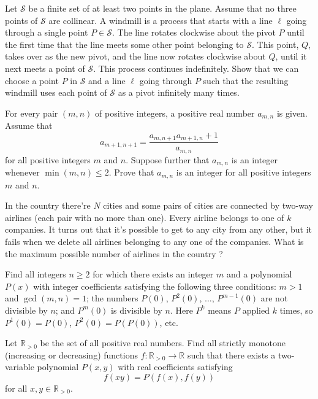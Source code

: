 \documentclass[11pt]{scrartcl}
\begin{document}
\begin{problem}[56332281758558]
	Let $\mathcal{S}$ be a finite set of at least two points in the plane. Assume that no three points of $\mathcal S$ are collinear. A windmill is a process that starts with a line $\ell$ going through a single point $P \in \mathcal S$. The line rotates clockwise about the pivot $P$ until the first time that the line meets some other point belonging to $\mathcal S$. This point, $Q$, takes over as the new pivot, and the line now rotates clockwise about $Q$, until it next meets a point of $\mathcal S$. This process continues indefinitely.
Show that we can choose a point $P$ in $\mathcal S$ and a line $\ell$ going through $P$ such that the resulting windmill uses each point of $\mathcal S$ as a pivot infinitely many times.
\end{problem}
\begin{problem}[5180896359975323937]
For every pair $(m, n)$ of positive integers, a positive real number $a_{m, n}$ is given. Assume that
\[a_{m+1, n+1} = \frac{a_{m, n+1} a_{m+1, n} + 1}{a_{m, n}}\]for all positive integers $m$ and $n$. Suppose further that $a_{m, n}$ is an integer whenever $\min(m, n) \le 2$. Prove that $a_{m, n}$ is an integer for all positive integers $m$ and $n$.
\end{problem}
\begin{problem}[697045850918084]
	In the country there're $N$ cities and some pairs of cities are connected by two-way airlines (each pair with no more than one). Every airline belongs to one of $k$ companies. It turns out that it's possible to get to any city from any other, but it fails when we delete all airlines belonging to any one of the companies. What is the maximum possible number of airlines in the country ?
\end{problem}
\begin{problem}[7904897494032012729]
Find all integers $n \ge 2$ for which there exists an integer $m$ and a polynomial $P(x)$ with integer coefficients satisfying the following three conditions:
$m > 1$ and $\gcd(m,n) = 1$;
the numbers $P(0)$, $P^2(0)$, $\ldots$, $P^{m-1}(0)$ are not divisible by $n$; and
$P^m(0)$ is divisible by $n$.
Here $P^k$ means $P$ applied $k$ times, so $P^1(0) = P(0)$, $P^2(0) = P(P(0))$, etc.
\end{problem}
\begin{problem}[361772755079059]
Let $\mathbb{R}_{>0}$ be the set of all positive real numbers. Find all strictly monotone (increasing or decreasing) functions $f:\mathbb{R}_{>0} \to \mathbb{R}$ such that there exists a two-variable polynomial $P(x, y)$ with real coefficients satisfying
$$
f(xy)=P(f(x), f(y))
$$for all $x, y\in\mathbb{R}_{>0}$.
\end{problem}
\end{document}
